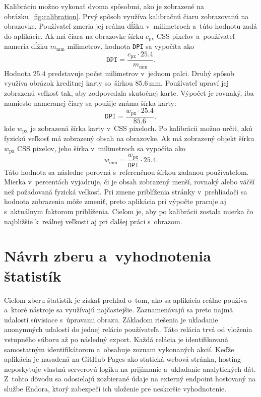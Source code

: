 Kalibráciu možno vykonať dvoma spôsobmi, ako je zobrazené na obrázku~\ref{fig:calibration}. Prvý spôsob využíva kalibračnú čiaru zobrazovanú na obrazovke. Používateľ zmeria jej reálnu dĺžku v~milimetroch a~túto hodnotu zadá do aplikácie. Ak má čiara na obrazovke šírku \(c_{\mathrm{px}}\) CSS pixelov a~používateľ nameria dĺžku \(m_{\mathrm{mm}}\) milimetrov, hodnota \texttt{DPI} sa vypočíta ako
\begin{equation}
    \texttt{DPI}=\frac{c_{\mathrm{px}}\cdot 25.4}{m_{\mathrm{mm}}}.
\end{equation}
Hodnota \(25.4\) predstavuje počet milimetrov v~jednom palci. Druhý spôsob využíva obrázok kreditnej karty so~šírkou \(85.6\,\mathrm{mm}\). Používateľ upraví jej zobrazenú veľkosť tak, aby zodpovedala skutočnej karte. Výpočet je rovnaký, iba namiesto nameranej čiary sa použije známa šírka karty:
\begin{equation}
    \texttt{DPI}=\frac{w_{\mathrm{px}}\cdot 25.4}{85.6},
\end{equation}
kde \(w_{\mathrm{px}}\) je zobrazená šírka karty v~CSS pixeloch. Po kalibrácii možno určiť, akú fyzickú veľkosť má zobrazený obsah na obrazovke. Ak má zobrazený objekt šírku \(w_{\mathrm{px}}\) CSS pixelov, jeho šírka v~milimetroch sa vypočíta ako
\begin{equation}
    w_{\mathrm{mm}}=\frac{w_{\mathrm{px}}}{\texttt{DPI}}\cdot 25.4.
\end{equation}
Táto hodnota sa následne porovná s~referenčnou šírkou zadanou používateľom. Mierka v~percentách vyjadruje, či je obsah zobrazený menší, rovnaký alebo väčší než požadovaná fyzická veľkosť. Pri zmene priblíženia stránky v~prehliadači sa hodnota zobrazenia môže zmeniť, preto aplikácia pri výpočte pracuje aj s~aktuálnym faktorom priblíženia. Cieľom je, aby po kalibrácii zostala mierka čo najbližšie k~reálnej veľkosti aj pri ďalšej práci s~obrazom.

\section{Návrh zberu a~vyhodnotenia štatistík}

Cieľom zberu štatistík je získať prehľad o~tom, ako sa aplikácia reálne používa a~ktoré nástroje sa využívajú najčastejšie. Zaznamenávajú sa preto najmä udalosti súvisiace s~úpravami obrazu. Základom riešenia je ukladanie anonymných udalostí do jednej relácie používateľa. Táto relácia trvá od vloženia vstupného súboru až po následný export. Každá relácia je identifikovaná samostatným identifikátorom a~obsahuje zoznam vykonaných akcií. Keďže aplikácia je nasadená na GitHub Pages ako statická webová stránka, hosting neposkytuje vlastnú serverovú logiku na prijímanie a~ukladanie analytických dát. Z~tohto dôvodu sa odosielajú zozbierané údaje na externý endpoint hostovaný na službe Endora, ktorý zabezpečí ich uloženie pre neskoršie vyhodnotenie.

